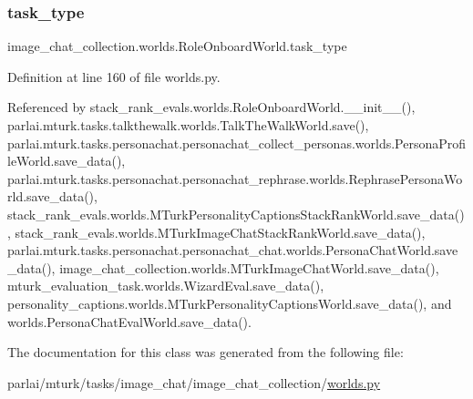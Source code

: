 \subsubsection{\texorpdfstring{task\+\_\+type}{task\_type}}
{\footnotesize\ttfamily image\+\_\+chat\+\_\+collection.\+worlds.\+Role\+Onboard\+World.\+task\+\_\+type}



Definition at line 160 of file worlds.\+py.



Referenced by stack\+\_\+rank\+\_\+evals.\+worlds.\+Role\+Onboard\+World.\+\_\+\+\_\+init\+\_\+\+\_\+(), parlai.\+mturk.\+tasks.\+talkthewalk.\+worlds.\+Talk\+The\+Walk\+World.\+save(), parlai.\+mturk.\+tasks.\+personachat.\+personachat\+\_\+collect\+\_\+personas.\+worlds.\+Persona\+Profile\+World.\+save\+\_\+data(), parlai.\+mturk.\+tasks.\+personachat.\+personachat\+\_\+rephrase.\+worlds.\+Rephrase\+Persona\+World.\+save\+\_\+data(), stack\+\_\+rank\+\_\+evals.\+worlds.\+M\+Turk\+Personality\+Captions\+Stack\+Rank\+World.\+save\+\_\+data(), stack\+\_\+rank\+\_\+evals.\+worlds.\+M\+Turk\+Image\+Chat\+Stack\+Rank\+World.\+save\+\_\+data(), parlai.\+mturk.\+tasks.\+personachat.\+personachat\+\_\+chat.\+worlds.\+Persona\+Chat\+World.\+save\+\_\+data(), image\+\_\+chat\+\_\+collection.\+worlds.\+M\+Turk\+Image\+Chat\+World.\+save\+\_\+data(), mturk\+\_\+evaluation\+\_\+task.\+worlds.\+Wizard\+Eval.\+save\+\_\+data(), personality\+\_\+captions.\+worlds.\+M\+Turk\+Personality\+Captions\+World.\+save\+\_\+data(), and worlds.\+Persona\+Chat\+Eval\+World.\+save\+\_\+data().



The documentation for this class was generated from the following file\+:\begin{DoxyCompactItemize}
\item 
parlai/mturk/tasks/image\+\_\+chat/image\+\_\+chat\+\_\+collection/\hyperlink{parlai_2mturk_2tasks_2image__chat_2image__chat__collection_2worlds_8py}{worlds.\+py}\end{DoxyCompactItemize}
